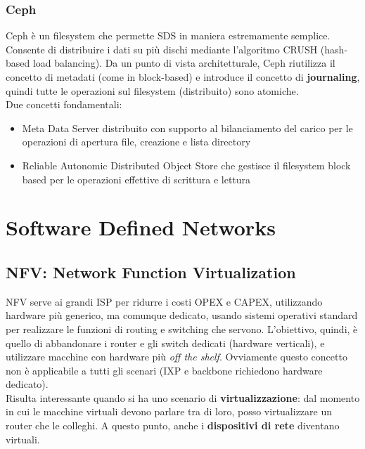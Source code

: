 \documentclass{article}
\begin{document}
		\subsubsection{Ceph}
		Ceph è un filesystem che permette SDS in maniera estremamente semplice. Consente di distribuire i dati su più dischi mediante l’algoritmo	CRUSH (hash-based load balancing). Da un punto di vista architetturale, Ceph riutilizza il concetto di metadati (come in block-based) e introduce il concetto di \textbf{journaling}, quindi tutte le operazioni sul filesystem (distribuito) sono atomiche.\\
		Due concetti fondamentali:
		\begin{itemize}
		\item Meta Data Server distribuito con supporto al bilanciamento del carico per le operazioni di apertura file, creazione e lista directory
		\item Reliable Autonomic Distributed Object Store che gestisce il filesystem block based per le operazioni effettive di scrittura e lettura
		\end{itemize}
		
		\newpage
		\section{Software Defined Networks}
		\subsection{NFV: Network Function Virtualization}
		
		NFV serve ai grandi ISP per ridurre i costi OPEX e CAPEX, utilizzando hardware più generico, ma comunque dedicato, usando sistemi operativi standard per realizzare le funzioni di routing e switching che servono.
		L’obiettivo, quindi, è quello di abbandonare i router e gli switch dedicati (hardware verticali), e utilizzare macchine con hardware più \textit{off the shelf}. Ovviamente questo
		concetto non è applicabile a tutti gli scenari (IXP e backbone richiedono hardware	dedicato).\\
		
		Risulta interessante quando si ha uno scenario di \textbf{virtualizzazione}: dal momento in cui le macchine virtuali devono parlare tra di loro, posso virtualizzare un router che le colleghi. A questo punto, anche i \textbf{dispositivi di rete} diventano virtuali.
		
\end{document}
